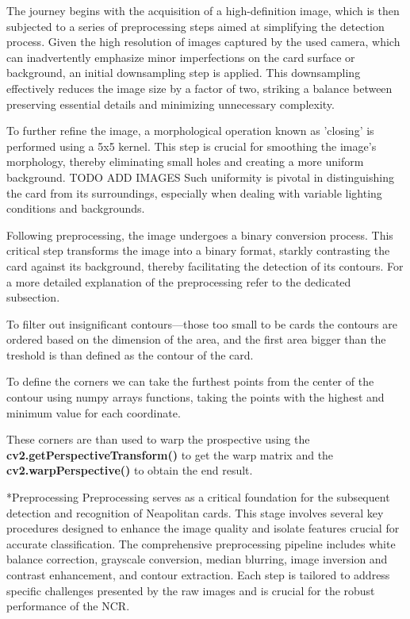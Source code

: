 \documentclass[twocolumn, a4paper,10pt]{article}
\makeatletter
\renewcommand\subsection{\@startsection{subsection}{1}{\z@}{\z@}{\z@}{\normalfont\normalsize\bfseries}}
\renewcommand\subsection{\@startsection{subsection}{1}{\z@}{\z@}{0.1pt}{\normalfont\normalsize\bfseries}}
\makeatother
\begin{document}
The journey begins with the acquisition of a high-definition image, which is then subjected to a series of preprocessing steps aimed at simplifying the detection process. Given the high resolution of images captured by the used camera, which can inadvertently emphasize minor imperfections on the card surface or background, an initial downsampling step is applied. This downsampling effectively reduces the image size by a factor of two, striking a balance between preserving essential details and minimizing unnecessary complexity.

To further refine the image, a morphological operation known as 'closing' is performed using a 5x5 kernel. This step is crucial for smoothing the image's morphology, thereby eliminating small holes and creating a more uniform background. TODO ADD IMAGES Such uniformity is pivotal in distinguishing the card from its surroundings, especially when dealing with variable lighting conditions and backgrounds.

Following preprocessing, the image undergoes a binary conversion process. This critical step transforms the image into a binary format, starkly contrasting the card against its background, thereby facilitating the detection of its contours. For a more detailed explanation of the preprocessing refer to the dedicated subsection.

To filter out insignificant contours—those too small to be cards the contours are ordered based on the dimension of the area, and the first area bigger than the treshold is than defined as the contour of the card.

To define the corners we can take the furthest points from the center of the contour using numpy arrays functions, taking the points with the highest and minimum value for each coordinate.

These corners are than used to warp the prospective using the \textbf{cv2.getPerspectiveTransform()} to get the warp matrix and the \textbf{cv2.warpPerspective()} to obtain the end result.


\subsection*{Preprocessing} 
Preprocessing serves as a critical foundation for the subsequent detection and recognition of Neapolitan cards. This stage involves several key procedures designed to enhance the image quality and isolate features crucial for accurate classification. The comprehensive preprocessing pipeline includes  white balance correction, grayscale conversion, median blurring, image inversion and contrast enhancement, and contour extraction. Each step is tailored to address specific challenges presented by the raw images and is crucial for the robust performance of the NCR.
 
\end{document}
